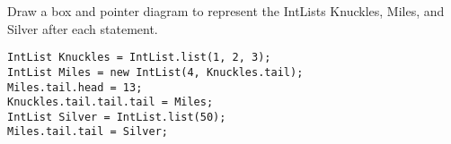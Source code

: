 \begin{blocksection}
\question Draw a box and pointer diagram to represent the IntLists Knuckles, Miles, and Silver after each statement.
\begin{lstlisting}
IntList Knuckles = IntList.list(1, 2, 3);
IntList Miles = new IntList(4, Knuckles.tail);
Miles.tail.head = 13;
Knuckles.tail.tail.tail = Miles;
IntList Silver = IntList.list(50);
Miles.tail.tail = Silver;
\end{lstlisting}

\ifprintanswers\else
\fi

\begin{solution}


\end{solution}
\end{blocksection}